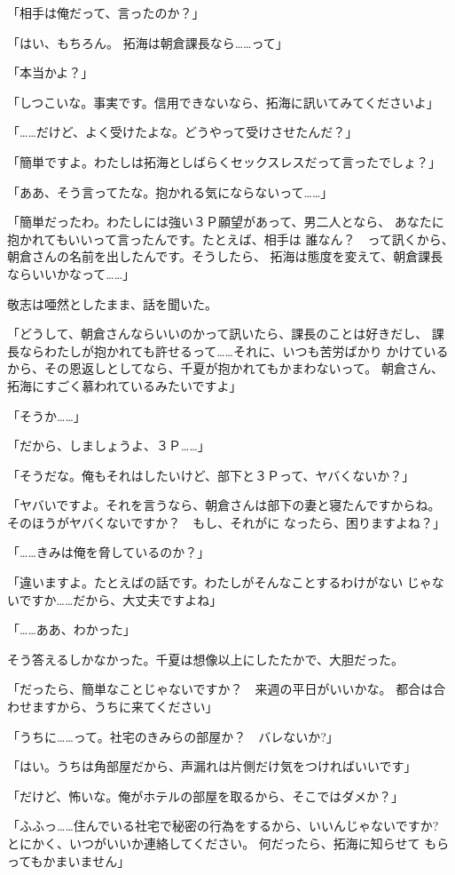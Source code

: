 ﻿\documentclass[
    book,tate,
    line_length=30zw,
    jafontsize=12pt,
    paper=b5j,
    landscape,
    ]{jlreq}
\begin{document}
「相手は俺だって、言ったのか？」

「はい、もちろん。 拓海は朝倉課長なら……って」

「本当かよ？」

「しつこいな。事実です。信用できないなら、拓海に訊いてみてくださいよ」

「……だけど、よく受けたよな。どうやって受けさせたんだ？」

「簡単ですよ。わたしは拓海としばらくセックスレスだって言ったでしょ？」

「ああ、そう言ってたな。抱かれる気にならないって……」

「簡単だったわ。わたしには強い３Ｐ願望があって、男二人となら、
あなたに抱かれてもいいって言ったんです。たとえば、相手は
誰なん？　って訊くから、朝倉さんの名前を出したんです。そうしたら、
拓海は態度を変えて、朝倉課長ならいいかなって……」

敬志は唖然としたまま、話を聞いた。

「どうして、朝倉さんならいいのかって訊いたら、課長のことは好きだし、
課長ならわたしが抱かれても許せるって……それに、いつも苦労ばかり
かけているから、その恩返しとしてなら、千夏が抱かれてもかまわないって。
朝倉さん、拓海にすごく慕われているみたいですよ」

「そうか……」

「だから、しましょうよ、３Ｐ……」

「そうだな。俺もそれはしたいけど、部下と３Ｐって、ヤバくないか？」

「ヤバいですよ。それを言うなら、朝倉さんは部下の妻と寝たんですからね。
そのほうがヤバくないですか？　もし、それがに
なったら、困りますよね？」

「……きみは俺を脅しているのか？」

「違いますよ。たとえばの話です。わたしがそんなことするわけがない
じゃないですか……だから、大丈夫ですよね」

「……ああ、わかった」

そう答えるしかなかった。千夏は想像以上にしたたかで、大胆だった。

「だったら、簡単なことじゃないですか？　来週の平日がいいかな。
都合は合わせますから、うちに来てください」

「うちに……って。社宅のきみらの部屋か？　バレないか?」

「はい。うちは角部屋だから、声漏れは片側だけ気をつければいいです」

「だけど、怖いな。俺がホテルの部屋を取るから、そこではダメか？」

「ふふっ……住んでいる社宅で秘密の行為をするから、いいんじゃないですか? 
とにかく、いつがいいか連絡してください。 何だったら、拓海に知らせて
もらってもかまいません」
\end{document}
